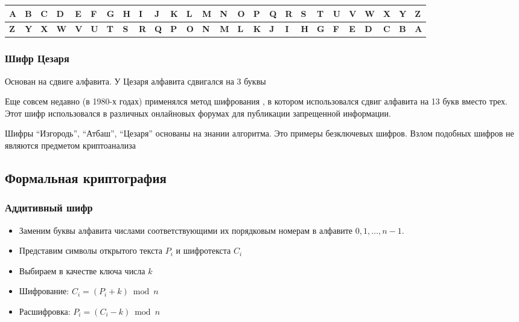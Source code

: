 \documentclass[a4paper, 14pt]{extarticle}
\begin{document}
\begin{tabular}{|l|l|l|l|l|l|l|l|l|l|l|l|l|l|l|l|l|l|l|l|l|l|l|l|l|l|} %
\hline %
\textbf{A} & \textbf{B} & \textbf{C} & \textbf{D} & \textbf{E} & \textbf{F} & \textbf{G} & \textbf{H} & \textbf{I} & \textbf{J} & \textbf{K} & \textbf{L} & \textbf{M} & \textbf{N} & \textbf{O} & \textbf{P} & \textbf{Q} & \textbf{R} & \textbf{S} & \textbf{T} & \textbf{U} & \textbf{V} & \textbf{W} & \textbf{X} & \textbf{Y} & \textbf{Z} \\ \hline %
\textbf{Z} & \textbf{Y} & \textbf{X} & \textbf{W} & \textbf{V} & \textbf{U} & \textbf{T} & \textbf{S} & \textbf{R} & \textbf{Q} & \textbf{P} & \textbf{O} & \textbf{N} & \textbf{M} & \textbf{L} & \textbf{K} & \textbf{J} & \textbf{I} & \textbf{H} & \textbf{G} & \textbf{F} & \textbf{E} & \textbf{D} & \textbf{C} & \textbf{B} & \textbf{A} \\ \hline %
\end{tabular}

\subsubsection{Шифр Цезаря}
Основан на сдвиге алфавита. У Цезаря алфавита сдвигался на 3 буквы

Еще совсем недавно (в 1980-х годах) применялся метод шифрования , в котором использовался сдвиг алфавита на 13 букв вместо трех. Этот шифр использовался в различных онлайновых форумах для публикации запрещенной информации.

Шифры ``Изгородь'', ``Атбаш'', ``Цезаря'' основаны на знании алгоритма. Это примеры безключевых шифров. Взлом подобных шифров не являются предметом криптоанализа

\subsection{Формальная криптография}
\subsubsection{Аддитивный шифр}
\begin{itemize}
    \item Заменим буквы алфавита числами соответствующими их порядковым номерам в алфавите $0, 1, \ldots, n-1$.
    \item Представим символы открытого текста $P_i$ и шифротекста $C_i$
    \item Выбираем в качестве ключа числа $k$
    \item Шифрование: $C_i = (P_i + k) \bmod n$ 
    \item Расшифровка: $ P_i = (C_i - k) \bmod n $
\end{itemize}
\end{document}
